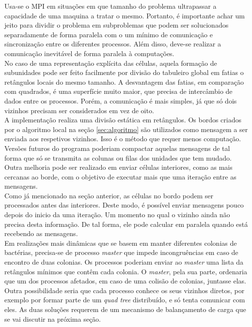 \label{sec:distribuicao}

Usa-se o MPI em situações em que tamanho do problema ultrapassar a capacidade de uma maquina a tratar o mesmo. Portanto, é importante achar um jeito para dividir o problema em subproblemas que podem ser solucionados separadamente de forma paralela com o um mínimo de comunicação e sincronização entre os diferentes processos. Além disso, deve-se realizar a comunicação inevitável de forma paralela à computações. \\

No caso de uma representação explícita das células, aquela formação de subunidades pode ser feito facilmente por divisão do tabuleiro global em fatias o retângulos locais do mesmo tamanho. A desvantagem das fatias, em comparação com quadrados, é uma superfície muito maior, que precisa de intercâmbio de dados entre os processos. Porém, a comunicação é mais simples, já que só dois vizinhos precisam ser considerados em vez de oito.\\

A implementação realiza uma divisão estática em retângulos. Os bordos criados por o algoritmo local na seção \ref{sec:algoritmo} são utilizados como mensagem a ser enviada aos respetivos vizinhos. Isso é o método que requer menos computação. Versões futuros do programa poderiam compactar aquelas mensagens de tal forma que só se transmita as colunas ou filas dos unidades que tem mudado. Outra melhoria pode ser realizado em enviar células interiores, como as mais cercanas ao borde, com o objetivo de executar mais que uma iteração entre as mensagens.\\

Como já mencionado na seção anterior, as células no bordo podem ser processados antes das interiores. Deste modo, é possível enviar mensagens pouco depois do inicio da uma iteração. Um momento no qual o vizinho ainda não precisa desta informação. De tal forma, ele pode calcular em paralela quando está recebendo as mensagens.\\

Em realizações mais dinâmicas que se basem em manter diferentes colonias de bactérias, precisa-se de processo \textit{master} que impede incongruências em caso de encontro de duas colonias. Os processos poderiam enviar ao \textit{master} uma lista da retângulos mínimos que contêm cada colonia. O \textit{master}, pela sua parte, ordenaria que um dos processos afetados, em caso de uma colisão de colonias, juntasse elas. Outra possibilidade seria que cada processo conhece os seus  vizinhos diretos, por exemplo por formar parte de um \textit{quad tree} distribuído, e só tenta comunicar com eles. As duas soluções requerem de um mecanismo de balançamento de carga que se vai discutir na próxima seção.

